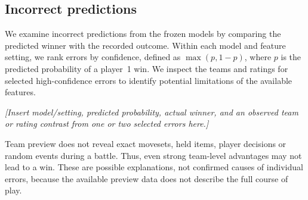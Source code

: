 \subsection{Incorrect predictions}
We examine incorrect predictions from the frozen models by comparing the
predicted winner with the recorded outcome. Within each model and feature
setting, we rank errors by confidence, defined as $\max(p,1-p)$, where $p$ is
the predicted probability of a player~1 win. We inspect the teams and ratings
for selected high-confidence errors to identify potential limitations of the
available features.

\textit{[Insert model/setting, predicted probability, actual winner, and an
observed team or rating contrast from one or two selected errors here.]}

Team preview does not reveal exact movesets, held items, player decisions or
random events during a battle. Thus, even strong team-level advantages may
not lead to a win. These are possible explanations, not confirmed causes of
individual errors, because the available preview data does not describe the
full course of play.
